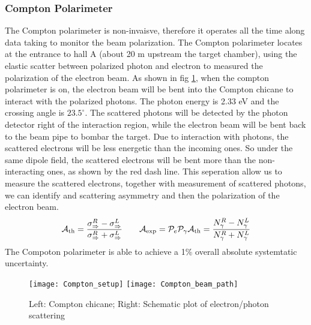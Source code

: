 \subsubsection{Compton Polarimeter}
The Compton polarimeter is non-invaisve, therefore it
operates all the time along data taking to monitor the beam polarization. The
Compton polarimeter locates at the entrance to hall A (about 20 m upstream the 
target chamber), using the elastic scatter between polarized photon and electron
to measured the polarization of the electron beam. As shown in fig \ref{fig:compton_pol},
when the compton polarimeter is on, the electron beam will be bent into the 
Compton chicane to interact with the polarized photons. The photon energy is 
2.33 eV and the crossing angle is $23.5^\circ$. The scattered photons will be
detected by the photon detector right of the interaction region, while the
electron beam will be bent back to the beam pipe to bombar the target. Due to
interaction with photons, the scattered electrons will be less energetic than
the incoming ones. So under the same dipole field, the scattered electrons will
be bent more than the non-interacting ones, as shown by the red dash line. This 
seperation allow us to measure the scattered electrons, together with measurement
of scattered photons, we can identify and scattering asymmetry and then the polarization
of the electron beam.
\begin{equation*}
    \mathcal{A}_{\text{th}} = \frac{\sigma_{\Rightarrow}^{R} - \sigma_{\Rightarrow}^{L}}{\sigma_{\Rightarrow}^{R} + \sigma_{\Rightarrow}^{L}}  \qquad
    \mathcal{A}_{\text{exp}} = \mathcal{P}_{e}\mathcal{P}_{\gamma}\mathcal{A}_{\text{th}} = \frac{N_{\gamma}^R - N_{\gamma}^L}{N_{\gamma}^R + N_{\gamma}^L}
\end{equation*}
The Compoton polarimeter is able to achieve a 1\% overall absolute systemtatic
uncertainty.
\begin{figure}[h!]
    \texttt{[image: Compton\_setup]}
    \texttt{[image: Compton\_beam\_path]}
    \caption{Left: Compton chicane; Right: Schematic plot of electron/photon 
    scattering} 
    \label{fig:compton_pol}
\end{figure}

